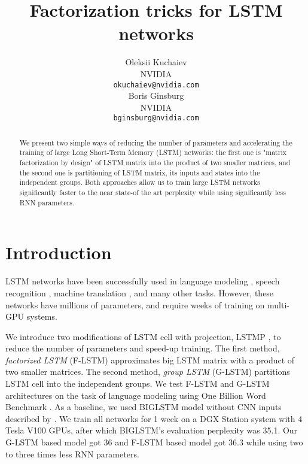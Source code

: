 \documentclass{article} \usepackage{iclr2017_workshop,times}
\title{Factorization tricks for LSTM networks}
\author{Oleksii Kuchaiev \\
NVIDIA \\
\texttt{okuchaiev@nvidia.com} \\ 
\And
Boris Ginsburg \\
NVIDIA\\
\texttt{bginsburg@nvidia.com} \\
}
\begin{document}
\maketitle

\begin{abstract}
We present two simple ways of reducing the number of parameters and accelerating the training of large Long Short-Term Memory (LSTM) networks: the first one is "matrix factorization by design" of LSTM matrix into the product of two smaller matrices, and the second one is partitioning of LSTM matrix, its inputs and states into the independent groups. Both approaches allow us to train large LSTM networks significantly faster to the near state-of the art perplexity while using significantly less RNN parameters.
\end{abstract}

\section{Introduction}
LSTM networks  \citep{hochreiter1997long} have been successfully used in language modeling  \citep{jozefowicz2016exploring,shazeer2017outrageously}, speech recognition \citep{xiong2016achieving}, machine translation \citep{wu2016google}, and many other tasks. However, these networks have millions of parameters, and require weeks of training on multi-GPU systems.

We introduce two modifications of LSTM cell with projection, LSTMP \citep{sak2014long}, to reduce the number of parameters and speed-up training. The first method, \textit{factorized LSTM} (F-LSTM) approximates big LSTM matrix with a product of two smaller matrices. The second method, \textit{group LSTM} (G-LSTM) partitions LSTM cell into the independent groups. We test  F-LSTM and G-LSTM architectures on the task of language modeling using One Billion Word Benchmark \citep{chelba2013one}. As a baseline, we used BIGLSTM model without CNN inputs described by \citet{jozefowicz2016exploring}. We train all networks for 1 week on a DGX Station system with 4 Tesla V100 GPUs, after which BIGLSTM's evaluation perplexity was 35.1. Our G-LSTM based model got 36 and F-LSTM based model got 36.3 while using two to three times less RNN parameters.
\end{document}
